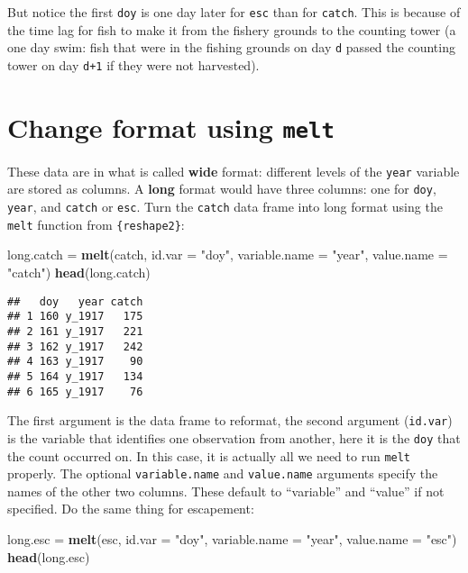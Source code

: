 \documentclass[]{book}
\newenvironment{Shaded}{\begin{snugshade}}{\end{snugshade}}
\newcommand{\KeywordTok}[1]{\textcolor[rgb]{0.13,0.29,0.53}{\textbf{#1}}}
\newcommand{\DataTypeTok}[1]{\textcolor[rgb]{0.13,0.29,0.53}{#1}}
\newcommand{\StringTok}[1]{\textcolor[rgb]{0.31,0.60,0.02}{#1}}
\newcommand{\NormalTok}[1]{#1}
\theoremstyle{definition}
\theoremstyle{definition}
\theoremstyle{definition}
\theoremstyle{remark}
\begin{document}
But notice the first \texttt{doy} is one day later for \texttt{esc} than
for \texttt{catch}. This is because of the time lag for fish to make it
from the fishery grounds to the counting tower (a one day swim: fish
that were in the fishing grounds on day \texttt{d} passed the counting
tower on day \texttt{d+1} if they were not harvested).

\section{\texorpdfstring{Change format using
\texttt{melt}}{Change format using melt}}\label{change-format-using-melt}

These data are in what is called \textbf{wide} format: different levels
of the \texttt{year} variable are stored as columns. A \textbf{long}
format would have three columns: one for \texttt{doy}, \texttt{year},
and \texttt{catch} or \texttt{esc}. Turn the \texttt{catch} data frame
into long format using the \texttt{melt} function from
\texttt{\{reshape2\}}:

\begin{Shaded}
\begin{Highlighting}[]
\NormalTok{long.catch =}\StringTok{ }\KeywordTok{melt}\NormalTok{(catch, }\DataTypeTok{id.var =} \StringTok{"doy"}\NormalTok{,}
                  \DataTypeTok{variable.name =} \StringTok{"year"}\NormalTok{,}
                  \DataTypeTok{value.name =} \StringTok{"catch"}\NormalTok{)}
\KeywordTok{head}\NormalTok{(long.catch)}
\end{Highlighting}
\end{Shaded}

\begin{verbatim}
##   doy   year catch
## 1 160 y_1917   175
## 2 161 y_1917   221
## 3 162 y_1917   242
## 4 163 y_1917    90
## 5 164 y_1917   134
## 6 165 y_1917    76
\end{verbatim}

The first argument is the data frame to reformat, the second argument
(\texttt{id.var}) is the variable that identifies one observation from
another, here it is the \texttt{doy} that the count occurred on. In this
case, it is actually all we need to run \texttt{melt} properly. The
optional \texttt{variable.name} and \texttt{value.name} arguments
specify the names of the other two columns. These default to
``variable'' and ``value'' if not specified. Do the same thing for
escapement:

\begin{Shaded}
\begin{Highlighting}[]
\NormalTok{long.esc =}\StringTok{ }\KeywordTok{melt}\NormalTok{(esc, }\DataTypeTok{id.var =} \StringTok{"doy"}\NormalTok{,}
                \DataTypeTok{variable.name =} \StringTok{"year"}\NormalTok{,}
                \DataTypeTok{value.name =} \StringTok{"esc"}\NormalTok{)}
\KeywordTok{head}\NormalTok{(long.esc)}
\end{Highlighting}
\end{Shaded}
\end{document}
